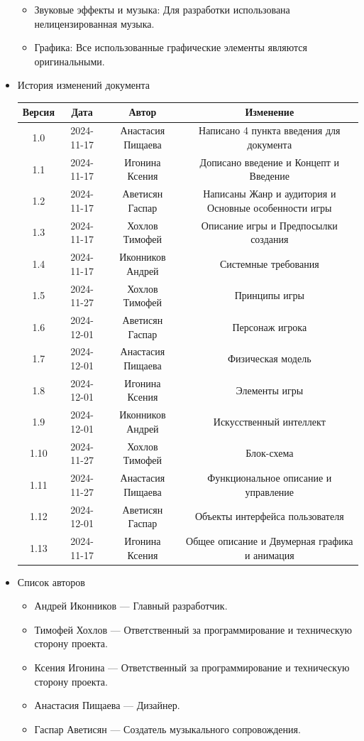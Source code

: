 \documentclass{article}
\begin{document}
\begin{itemize}
\begin{itemize}
\item Звуковые эффекты и музыка: Для разработки использована нелицензированная музыка.

\item Графика: Все использованные графические элементы являются оригинальными.
\end{itemize}

\item История изменений документа
\begin{center}
\begin{tabular}{| c | c | c | c |}
\hline
 Версия & Дата & Автор & Изменение \\  \hline
 1.0 & 2024-11-17 & Анастасия Пищаева & Написано 4 пункта введения для документа\\ \hline
 1.1 & 2024-11-17 & Игонина Ксения & Дописано введение и Концепт и Введение\\  \hline 
 1.2 & 2024-11-17 & Аветисян Гаспар & Написаны Жанр и аудитория и Основные особенности игры\\  \hline
 1.3 & 2024-11-17 & Хохлов Тимофей & Описание игры и Предпосылки создания\\  \hline
 1.4 & 2024-11-17 & Иконников Андрей & Системные требования\\ \hline 
 1.5 & 2024-11-27 & Хохлов Тимофей & Принципы игры\\  \hline
 1.6 & 2024-12-01 & Аветисян Гаспар & Персонаж игрока\\ \hline
 1.7 & 2024-12-01 & Анастасия Пищаева & Физическая модель\\ \hline
 1.8 & 2024-12-01 & Игонина Ксения & Элементы игры\\ \hline
 1.9 & 2024-12-01 & Иконников Андрей & Искусственный интеллект\\ \hline
 1.10 & 2024-11-27 & Хохлов Тимофей & Блок-схема\\  \hline
 1.11 & 2024-11-27 & Анастасия Пищаева & Функциональное описание и управление\\  \hline
 1.12 & 2024-12-01 & Аветисян Гаспар & Объекты интерфейса пользователя\\ \hline
 1.13 & 2024-11-17 & Игонина Ксения & Общее описание и Двумерная графика и анимация\\  \hline 


\end{tabular}
\end{center}

\item Список авторов
	\begin{itemize}
		\item Андрей Иконников — Главный разработчик.
		\item Тимофей Хохлов — Ответственный за программирование и техническую сторону проекта.
		\item Ксения Игонина — Ответственный за программирование и техническую сторону проекта.
		\item Анастасия Пищаева — Дизайнер.
		\item Гаспар Аветисян — Создатель музыкального сопровождения.
	\end{itemize}


\end{itemize}
\end{document}
